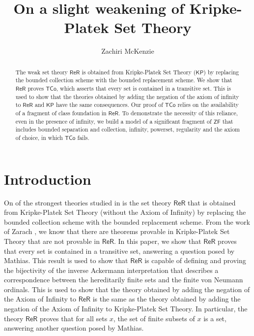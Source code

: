 \documentclass[11pt, a4paper]{article}
\newcounter{Theor1}
\begin{document}
\title{On a slight weakening of Kripke-Platek Set Theory} 
\author[1]{Zachiri McKenzie}
\maketitle

\begin{abstract}
The weak set theory $\mathsf{ReR}$ is obtained from Kripke-Platek Set Theory ($\mathsf{KP}$) by replacing the bounded collection scheme with the bounded replacement scheme. We show that $\mathsf{ReR}$ proves $\mathsf{TCo}$, which asserts that every set is contained in a transitive set. This is used to show that the theories obtained by adding the negation of the axiom of infinity to $\mathsf{ReR}$ and $\mathsf{KP}$ have the same consequences. Our proof of $\mathsf{TCo}$ relies on the availability of a fragment of class foundation in $\mathsf{ReR}$. To demonstrate the necessity of this reliance, even in the presence of infinity, we build a model of a significant fragment of $\mathsf{ZF}$ that includes bounded separation and collection, infinity, powerset, regularity and the axiom of choice, in which $\mathsf{TCo}$ fails.
\end{abstract}

\section[Introduction]{Introduction}

On of the strongest theories studied in \cite{mat06} is the set theory $\mathsf{ReR}$ that is obtained from Kripke-Platek Set Theory (without the Axiom of Infinity) by replacing the bounded collection scheme with the bounded replacement scheme. From the work of Zarach \cite{zar96}, we know that there are theorems provable in Kripke-Platek Set Theory that are not provable in $\mathsf{ReR}$. In this paper, we show that $\mathsf{ReR}$ proves that every set is contained in a transitive set, answering a question \cite[Problem 2.107]{mat06} posed by Mathias. This result is used to show that $\mathsf{ReR}$ is capable of defining and proving the bijectivity of the inverse Ackermann interpretation that describes a correspondence between the hereditarily finite sets and the finite von Neumann ordinals. This is used to show that the theory obtained by adding the negation of the Axiom of Infinity to $\mathsf{ReR}$ is the same as the theory obtained by adding the negation of the Axiom of Infinity to Kripke-Platek Set Theory. In particular, the theory $\mathsf{ReR}$ proves that for all sets $x$, the set of finite subsets of $x$ is a set, answering another question \cite[Problem 8.26]{mat06} posed by Mathias.
\end{document}
